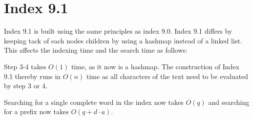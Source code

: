\section{Index 9.1}
Index 9.1 is built using the same principles as index 9.0. Index 9.1 differs by keeping tack of each nodes children by using a hashmap instead of a linked list. This affects the indexing time and the search time as follows:

Step 3-4 takes $O(1)$ time, as it now is a hashmap. The construction of Index 9.1 thereby runs in $O(n)$ time as all characters of the text need to be evaluated by step 3 or 4.

Searching for a single complete word in the index now takes $O(q)$ and searching for a prefix now takes  $O(q + d\cdot a)$.

